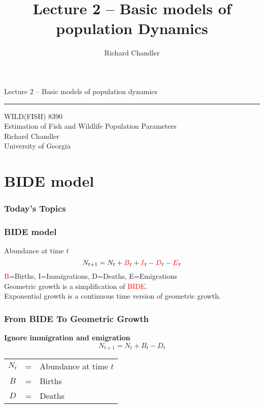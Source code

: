 \documentclass[color=usenames,dvipsnames]{beamer}\usepackage[]{graphicx}\usepackage[]{color}
\title{Lecture 2 -- Basic models of population Dynamics}
\author{Richard Chandler}
\begin{document}



\begin{frame}[plain]
  \LARGE
  \centering
  {\huge Lecture 2 -- Basic models of population dynamics} \\
  {\color{default} \rule{\textwidth}{0.1pt}}
  \vfill
  \large
  WILD(FISH) 8390 \\
  Estimation of Fish and Wildlife Population Parameters \\
  \vfill
  \large
  Richard Chandler \\
  University of Georgia \\
\end{frame}




\section{BIDE model}%


\begin{frame}[plain]
  \frametitle{Today's Topics}
  \Large
\end{frame}



\begin{frame}
  \frametitle{BIDE model}
  Abundance at time $t$
  \[
    N_{t+1} = N_t + {\color{red}B}_t + {\color{red}I}_t - {\color{red}D}_t - {\color{red}E}_t
  \]
  \textcolor{red}{B}=Births, {\color{red}I}=Immigrations,
  {\color{red}D}=Deaths, {\color{red}E}=Emigrations \\
  \pause
  \vfill
  Geometric growth is a simplification of \textcolor{red}{BIDE}. \\
  \pause
  \vfill
  Exponential growth is a continuous time version of geometric growth.
\end{frame}


\begin{frame}
  \frametitle{From {\color{red} BIDE} To Geometric Growth}
  {\bf \large Ignore immigration and emigration}
  \[
  N_{t+1} = N_t + B_t - D_t
  \]
  \vspace{0.5cm}
  \begin{tabular}{ccl}
    $N_t$ & = & Abundance at time $t$ \\
    {\color{red} $B$}    & = & Births       \\
    {\color{red} $D$}    & = & Deaths       \\
  \end{tabular}
\end{frame}
\end{document}
